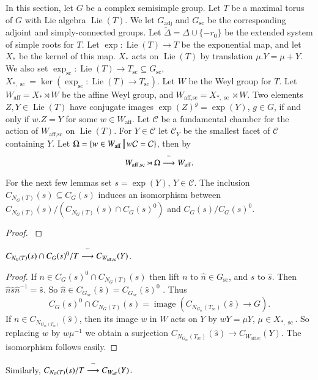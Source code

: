 \documentclass{amsart}
\newenvironment{cthm}[1]
  {\renewcommand\thethm{\bf #1}\thm}
  {\endthm}
\def\suchthat{\ {\vrule width1truept height.3truecm depth.1truecm}\ }
\def\tild#1{\widetilde#1}
\def\sc{\operatorname{sc}}
\def\Waff{W_{\operatorname{aff}}}
\def\Waffsc{W_{\operatorname{aff,sc}}}
\def\map{\buildrel{}\widetilde{}\over\longrightarrow}
\def\Liet{\operatorname{Lie}(T)}
\def\CurlyC{{\mathcal C}}
\def\CARTER{3}
\def\IWAHORI{13}
\begin{document}
In this section, let $G$ be a complex semisimple group.
Let $T$ be a maximal torus of $G$ with Lie
algebra $\Liet$.  We let $G_{\operatorname{adj}}$ and 
$G_{\sc}$ be the corresponding adjoint and simply-connected groups.
Let $\tild\Delta =\Delta\cup\{-r_0\}$ be the extended system of
simple roots for $T$.  Let $\exp:\Liet\to T$ be the exponential map,
and let $X_*$ be the kernel of this map.  $X_*$ acts on $\Liet$
by translation $\mu.Y=\mu+Y$. We also set 
$\exp_{\sc}:\Liet\to T_{\sc}\subseteq G_{\sc}$,
$X_{*,\sc}=\ker(\exp_{\sc}:\Liet\to T_{\sc})$.  Let $W$ be the 
Weyl group for $T$.  Let $\Waff= X_*\rtimes W$ be the affine Weyl group,
and $\Waffsc = X_{*,\sc}\rtimes W$.
Two elements $Z,Y\in \Liet$ have conjugate images
$\exp(Z)^g = \exp(Y)$, $g\in G$, if and only if
$w.Z=Y$ for some $w\in \Waff$.  Let $\CurlyC$ be a fundamental chamber
for the action of $\Waffsc$ on $\Liet$.  For 
$Y\in \CurlyC$ let $\CurlyC_Y$ be the smallest facet of $\CurlyC$
containing $Y$.  Let $\Omega=\{w\in\Waff
\suchthat w\CurlyC=\CurlyC\}$, then by \cite{\IWAHORI}
$$
\Waffsc\rtimes\Omega
\map
\Waff.
$$

For the next few lemmas set $s=\exp(Y)$, $Y\in \CurlyC$.
\begin{cthm}{Lemma 4.1}    The inclusion $C_{N_G(T)}(s)\subseteq
C_G(s)$ induces an isomorphism between
$
C_{N_G(T)}(s)/(C_{N_G(T)}(s)\cap C_G(s)^0)$ and $C_G(s)/C_G(s)^0$.
\end{cthm}

\begin{proof} \cite{\CARTER}
\end{proof}

\begin{cthm}{Lemma 4.2} 
$
C_{N_G(T)}(s)\cap C_G(s)^0/T\map C_{\Waffsc}(Y)
$.
\end{cthm}

\begin{proof}  If $n\in C_G(s)^0\cap C_{N_G(T)}(s)$ then
lift $n$ to $\widehat n\in G_{\sc}$, and $s$ to $\widehat s$.  Then 
$\widehat n\widehat s\widehat n^{-1}=\widehat s$.  So
$\widehat n\in C_{G_{sc}}(\widehat s) = C_{G_{sc}}(\widehat s)^0$ \cite{\CARTER}.
Thus
$$
C_G(s)^0\cap C_{N_G(T)}(s) =
\operatorname{image}\left(
C_{N_{G_{\sc}}(T_{\sc})}
(\widehat s)\to G\right).
$$
If $n\in C_{N_{G_{\sc}(T_{\sc})}}(\widehat s)$,
then its image $w$ in $W$ acts on $Y$
by $wY =\mu Y$, $\mu\in X_{*,\sc}$.  So replacing
$w$ by $w\mu^{-1}$ we obtain a surjection
$C_{N_{G_{\sc}}(T_{\sc})}(\widehat s)\to C_{\Waffsc}(Y)$.
The isomorphism follows easily.
\end{proof}
Similarly,
\begin{cthm}{Lemma 4.3}$C_{N_G(T)}(s)/T\map C_{\Waff}(Y)$.
\end{cthm}
\end{document}
